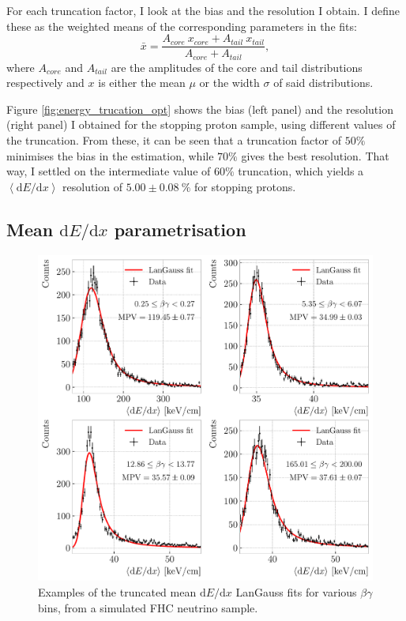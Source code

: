 For each truncation factor, I look at the bias and the resolution I obtain. I define these as the weighted means of the corresponding parameters in the fits:
\begin{equation}
	\bar{x} = \frac{A_{core}~x_{core}+A_{tail}~x_{tail}}{A_{core}+A_{tail}},
\end{equation}
where $A_{core}$ and $A_{tail}$ are the amplitudes of the core and tail distributions respectively and $x$ is either the mean $\mu$ or the width $\sigma$ of said distributions.

Figure \ref{fig:energy_trucation_opt} shows the bias (left panel) and the resolution (right panel) I obtained for the stopping proton sample, using different values of the truncation. From these, it can be seen that a truncation factor of $50\%$ minimises the bias in the estimation, while $70\%$ gives the best resolution. That way, I settled on the intermediate value of $60\%$ truncation, which yields a $\left<\mathrm{d}E/\mathrm{d}x\right>$ resolution of $5.00\pm0.08~\%$ for stopping protons.

\subsection[Mean \texorpdfstring{$\mathrm{d}E/\mathrm{d}x$}{dE/dx} parametrisation]{Mean \boldmath\texorpdfstring{$\mathrm{d}E/\mathrm{d}x$}{dE/dx} parametrisation}

\begin{figure}[t]
	\centering
	\includegraphics[width=.85\linewidth]{Images/GArSoft_PID/dEdx/dEdx_betagamma_examples.pdf}
	\caption[Examples of the truncated mean $\mathrm{d}E/\mathrm{d}x$ LanGauss fits for various $\beta\gamma$ bins, from a simulated FHC neutrino sample.]{Examples of the truncated mean $\mathrm{d}E/\mathrm{d}x$ LanGauss fits for various $\beta\gamma$ bins, from a simulated FHC neutrino sample.}
	\label{fig:dEdx_betagamma_fits}
\end{figure}

